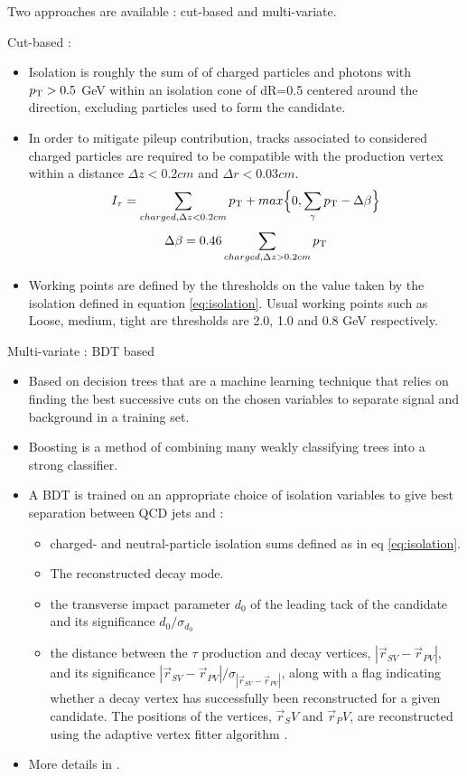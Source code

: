 Two approaches are available : cut-based and multi-variate.

Cut-based : 
\begin{itemize}
    \item Isolation is roughly the sum of \pt of charged particles and photons with $p_{\mathrm{T}} > 0.5$ GeV within an isolation cone of dR=0.5 centered around the \tauh direction, excluding particles used to form the \tauh candidate.
    \item In order to mitigate pileup contribution, tracks associated to considered charged particles are required to be compatible with the \tauh production vertex within a distance $\Delta z < 0.2 cm$ and $\Delta r < 0.03 cm$.
\begin{equation}
    I_{\tau} = \sum_{charged, \Delta z<0.2 cm} p_{\mathrm{T}} + max \Big\{ 0, \sum_{\gamma} p_{\mathrm{T}} - \Delta\beta \Big\}
    \label{eq:isolation}
\end{equation}
\begin{equation}
    \Delta \beta = 0.46 \sum_{charged,\Delta z>0.2 cm} p_{\mathrm{T}}
\end{equation}
    \item Working points are defined by the thresholds on the value taken by the isolation defined in equation \ref{eq:isolation}. Usual working points such as Loose, medium, tight are thresholds are 2.0, 1.0 and 0.8 GeV respectively.
\end{itemize}

Multi-variate : BDT based
\begin{itemize}
    \item Based on decision trees that are a machine learning technique that relies on finding the best successive cuts on the chosen variables to separate signal and background in a training set.
    \item Boosting is a method of combining many weakly classifying trees into a strong classifier.
    \item A BDT is trained on an appropriate choice of isolation variables to give best separation between QCD jets and \tauh : 
    \begin{itemize}
        \item charged- and neutral-particle isolation sums defined as in eq \ref{eq:isolation}.
        \item The reconstructed decay mode.
        \item the transverse impact parameter $d_0$ of the leading tack of the \tauh candidate and its significance $d_0 / \sigma_{d_0}$
        \item the distance between the $\tau$ production and decay vertices, $|\Vec{r}_{SV} - \Vec{r}_{PV}|$, and its significance $|\Vec{r}_{SV} - \Vec{r}_{PV}|/\sigma_{|\Vec{r}_{SV} - \Vec{r}_{PV}|}$, along with a flag indicating whether a decay vertex has successfully been reconstructed for a given \tauh candidate. The positions of the vertices, $\Vec{r}_SV$ and $\Vec{r}_PV$, are reconstructed using the adaptive vertex fitter algorithm \cite{Waltenberger_2007}.
    \end{itemize}
    \item More details in \cite{tauh_reconstruction}.
\end{itemize}

